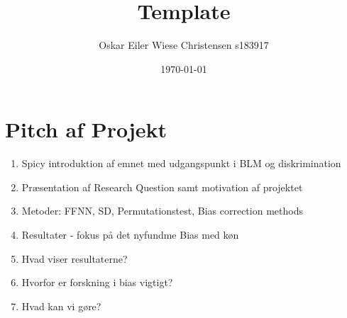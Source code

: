 \documentclass[11pt, fleqn, titlepage]{article}
\title{Template}
\author{Oskar Eiler Wiese Christensen s183917}
\date{\today}
\begin{document}
	\section*{Pitch af Projekt}
	\begin{enumerate}
	\item Spicy introduktion af emnet med udgangspunkt i BLM og diskrimination
	\item Præsentation af Research Question samt motivation af projektet
	\item Metoder: FFNN, SD, Permutationstest, Bias correction methods
	\item Resultater - fokus på det nyfundme Bias med køn
	\item Hvad viser resultaterne?
	\item Hvorfor er forskning i bias vigtigt?
	\item Hvad kan vi gøre?
	\end{enumerate}
\end{document}
